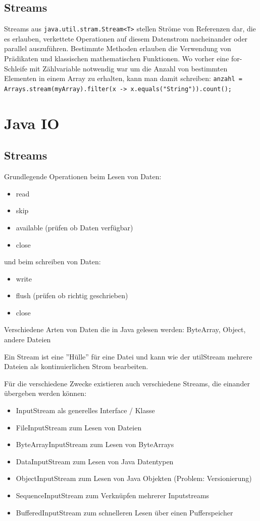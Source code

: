 \documentclass[12pt,a4]{article}
\begin{document}
	\subsection{Streams}
	Streams aus \texttt{java.util.stram.Stream<T>} stellen Ströme von Referenzen dar, die es erlauben, verkettete Operationen auf diesem Datenstrom nacheinander oder parallel auszuführen. Bestimmte Methoden erlauben die Verwendung von Prädikaten und klassischen mathematischen Funktionen. Wo vorher eine for-Schleife mit Zählvariable notwendig war um die Anzahl von bestimmten Elementen in einem Array zu erhalten, kann man damit schreiben: \texttt{anzahl = Arrays.stream(myArray).filter(x -> x.equals("String")).count();}
	
	\section{Java IO}
	\subsection{Streams}
	Grundlegende Operationen beim Lesen von Daten: 
	\begin{itemize}
		\item read
		\item skip
		\item available (prüfen ob Daten verfügbar)
		\item close
	\end{itemize}
	und beim schreiben von Daten: 
	\begin{itemize}
		\item write
		\item flush (prüfen ob richtig geschrieben)
		\item close
	\end{itemize}

	Verschiedene Arten von Daten die in Java gelesen werden: ByteArray, Object, andere Dateien
	
	Ein Stream ist  eine ''Hülle'' für eine Datei und kann wie der utilStream mehrere Dateien als kontinuierlichen Strom bearbeiten.
	
	Für die verschiedene Zwecke existieren auch verschiedene Streams, die einander übergeben werden können:
	\begin{itemize}
		\item InputStream als generelles Interface / Klasse
		\item FileInputStream zum Lesen von Dateien
		\item ByteArrayInputStream zum Lesen von ByteArrays
		\item DataInputStream zum Lesen von Java Datentypen
		\item ObjectInputStream zum Lesen von Java Objekten (Problem: Versionierung)
		\item SequenceInputStream zum Verknüpfen mehrerer Inputstreams
		\item BufferedInputStream zum schnelleren Lesen über einen Pufferspeicher
	\end{itemize}
\end{document}
